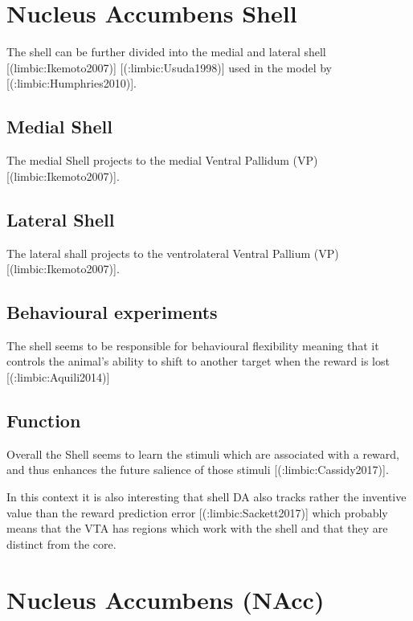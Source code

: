 {{\section{Nucleus Accumbens Shell}

The shell can be further divided into the medial and lateral shell [(limbic:Ikemoto2007)] [(:limbic:Usuda1998)] used in the model by [(:limbic:Humphries2010)].

\subsection{Medial Shell}

The medial Shell projects to the medial Ventral Pallidum (VP) [(limbic:Ikemoto2007)].

\subsection{Lateral Shell}

The lateral shall projects to the ventrolateral Ventral Pallium (VP) [(limbic:Ikemoto2007)].


\subsection{Behavioural experiments}

The shell seems to be responsible for behavioural flexibility meaning that it controls the animal's ability to shift to another target when the reward is lost [(:limbic:Aquili2014)]

\subsection{Function}

Overall the Shell seems to learn the stimuli which are associated with a reward, and thus enhances the future salience of those stimuli [(:limbic:Cassidy2017)].

In this context it is also interesting that shell DA also tracks rather the inventive value than the reward prediction error [(:limbic:Sackett2017)] which probably means that the VTA has regions which work with the shell and that they are distinct from the core.




\section{Nucleus Accumbens (NAcc)}

}}
